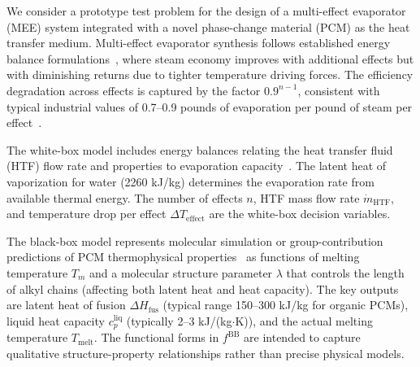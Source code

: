 \documentclass[12pt,a4paper]{article}%
\theoremstyle{plain}%
\theoremstyle{remark}%
\theoremstyle{definition}%
\def\BB{\mathrm{BB}}
\begin{document}
\begin{appendices}
We consider a prototype test problem for the design of a multi-effect evaporator (MEE) system integrated with a novel phase-change material (PCM) as the heat transfer medium. Multi-effect evaporator synthesis follows established energy balance formulations~\cite{hillenbrand1988synthesis}, where steam economy improves with additional effects but with diminishing returns due to tighter temperature driving forces. The efficiency degradation across effects is captured by the factor $0.9^{n-1}$, consistent with typical industrial values of 0.7--0.9 pounds of evaporation per pound of steam per effect~\cite{swenson2024mee}.

The white-box model includes energy balances relating the heat transfer fluid (HTF) flow rate and properties to evaporation capacity~\cite{ahmetovic2018simultaneous}. The latent heat of vaporization for water (2260 kJ/kg) determines the evaporation rate from available thermal energy. The number of effects $n$, HTF mass flow rate $\dot{m}_{\text{HTF}}$, and temperature drop per effect $\Delta T_{\text{effect}}$ are the white-box decision variables.

The black-box model represents molecular simulation or group-contribution predictions of PCM thermophysical properties~\cite{sharma2009review,zalba2003review} as functions of melting temperature $T_m$ and a molecular structure parameter $\lambda$ that controls the length of alkyl chains (affecting both latent heat and heat capacity). The key outputs are latent heat of fusion $\Delta H_{\text{fus}}$ (typical range 150--300 kJ/kg for organic PCMs), liquid heat capacity $c_p^{\text{liq}}$ (typically 2--3 kJ/(kg$\cdot$K)), and the actual melting temperature $T_{\text{melt}}$. The functional forms in $f^\BB$ are intended to capture qualitative structure-property relationships rather than precise physical models.


\end{appendices}
\end{document}
